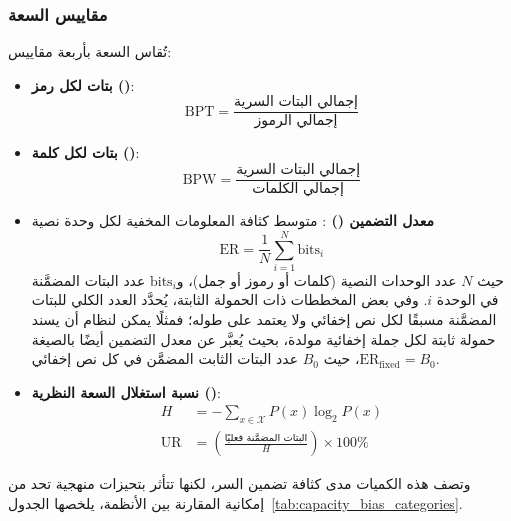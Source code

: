 \subsubsection{مقاييس السعة}

تُقاس السعة بأربعة مقاييس:

\begin{itemize}
  \item \textbf{بتات لكل رمز ()}:
        \begin{equation}
          \text{BPT} = \frac{\text{إجمالي البتات السرية}}{\text{إجمالي الرموز}}
        \end{equation}
  \item \textbf{بتات لكل كلمة ()}:
        \begin{equation}
          \text{BPW} = \frac{\text{إجمالي البتات السرية}}{\text{إجمالي الكلمات}}
        \end{equation}
  \item \textbf{معدل التضمين () \cite{10.1007/3-540-49380-8_21}}: متوسط كثافة المعلومات المخفية لكل وحدة نصية
        \begin{equation}
          \text{ER} = \frac{1}{N} \sum_{i=1}^{N} \text{bits}_i
        \end{equation}
        حيث $N$ عدد الوحدات النصية (كلمات أو رموز أو جمل)، و$\text{bits}_i$ عدد البتات المضمَّنة في الوحدة $i$. وفي بعض المخططات ذات الحمولة الثابتة، يُحدَّد العدد الكلي للبتات المضمَّنة مسبقًا لكل نص إخفائي ولا يعتمد على طوله؛ فمثلًا يمكن لنظام  أن يسند حمولة ثابتة لكل جملة إخفائية مولدة، بحيث يُعبَّر عن معدل التضمين أيضًا بالصيغة $\text{ER}_{\text{fixed}} = B_0$، حيث $B_0$ عدد البتات الثابت المضمَّن في كل نص إخفائي.
  \item \textbf{نسبة استغلال السعة النظرية ()}:
        \begin{align}
          H &= -\sum_{x \in \mathcal{X}} P(x) \log_2 P(x) \\
          \text{UR} &= \left( \frac{\text{البتات المضمَّنة فعليًا}}{H} \right) \times 100\%
        \end{align}
\end{itemize}

وتصف هذه الكميات مدى كثافة تضمين السر، لكنها تتأثر بتحيزات منهجية تحد من إمكانية المقارنة بين الأنظمة، يلخصها الجدول~\ref{tab:capacity_bias_categories}.

